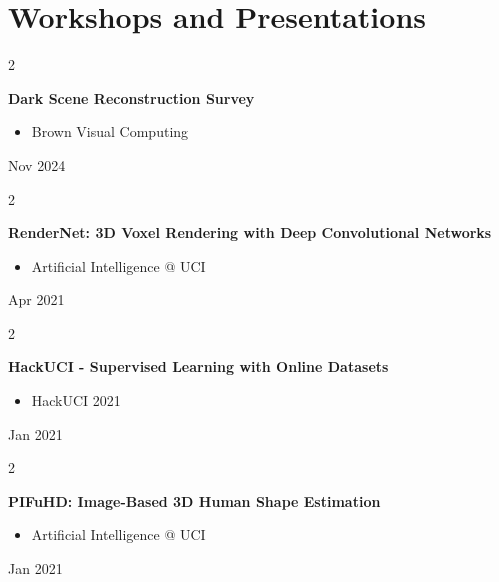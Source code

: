 \documentclass[10pt, letterpaper]{article}
\newenvironment{highlights}{
    \begin{itemize}[
        topsep=0.10 cm,
        parsep=0.10 cm,
        partopsep=0pt,
        itemsep=0pt,
        leftmargin=0.4 cm + 10pt
    ]
}{
    \end{itemize}
} %
\newenvironment{twocolentry}[2][]{
    \onecolentry
    \def\secondColumn{#2}
    \setcolumnwidth{\fill, 4.5 cm}
    \begin{paracol}{2}
}{
    \switchcolumn \raggedleft \secondColumn
    \end{paracol}
    \endonecolentry
} %
\begin{document}
    
    \section{Workshops and Presentations}



        
        \begin{twocolentry}{
            Nov 2024
        }
            \textbf{Dark Scene Reconstruction Survey}
            \begin{highlights}
                \item Brown Visual Computing
            \end{highlights}
        \end{twocolentry}


        \vspace{0.2 cm}

        \begin{twocolentry}{
            Apr 2021
        }
            \textbf{RenderNet: 3D Voxel Rendering with Deep Convolutional Networks}
            \begin{highlights}
                \item Artificial Intelligence @ UCI
            \end{highlights}
        \end{twocolentry}


        \vspace{0.2 cm}

        \begin{twocolentry}{
            Jan 2021
        }
            \textbf{HackUCI - Supervised Learning with Online Datasets}
            \begin{highlights}
                \item HackUCI 2021
            \end{highlights}
        \end{twocolentry}


        \vspace{0.2 cm}

        \begin{twocolentry}{
            Jan 2021
        }
            \textbf{PIFuHD: Image-Based 3D Human Shape Estimation}
            \begin{highlights}
                \item Artificial Intelligence @ UCI
            \end{highlights}
        \end{twocolentry}
\end{document}
